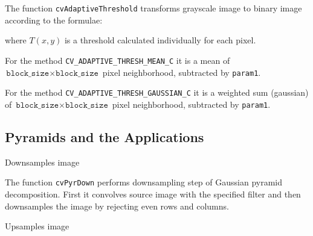 The function \texttt{cvAdaptiveThreshold} transforms grayscale image to binary image according to the formulae:

\begin{description}
\end{description}

where $T(x,y)$ is a threshold calculated individually for each pixel.

For the method \texttt{CV\_ADAPTIVE\_THRESH\_MEAN\_C} it is a mean of $\texttt{block\_size} \times \texttt{block\_size}$ pixel neighborhood, subtracted by \texttt{param1}.

For the method \texttt{CV\_ADAPTIVE\_THRESH\_GAUSSIAN\_C} it is a weighted sum (gaussian) of $\texttt{block\_size} \times \texttt{block\_size}$ pixel neighborhood, subtracted by \texttt{param1}.

\subsection{Pyramids and the Applications}

\label{PyrDown}

Downsamples image


\begin{description}
\end{description}

The function \texttt{cvPyrDown} performs downsampling step of Gaussian pyramid decomposition. First it convolves source image with the specified filter and then downsamples the image by rejecting even rows and columns.

\label{PyrUp}

Upsamples image


